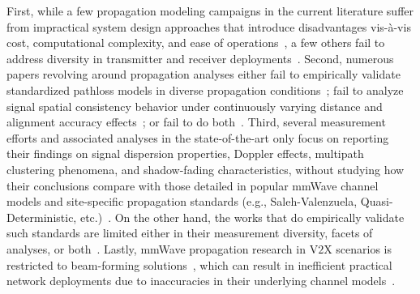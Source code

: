 \documentclass[12pt, draftcls, onecolumn]{IEEEtran}
\begin{document}
First, while a few propagation modeling campaigns in the current literature suffer from impractical system design approaches that introduce disadvantages vis-\`{a}-vis cost, computational complexity, and ease of operations~\cite{Purdue, Foliage, AgileLink}, a few others fail to address diversity in transmitter and receiver deployments~\cite{Harvard, Indoor60G, MacCartneyRural}. Second, numerous papers revolving around propagation analyses either fail to empirically validate standardized pathloss models in diverse propagation conditions~\cite{SpatialConsistencyOriginal, MolischSpatialOutdoor, MacCartneySpatialStatistics}; fail to analyze signal spatial consistency behavior under continuously varying distance and alignment accuracy effects~\cite{Outdoor28G, Qualcomm3GPP, MacCartneyModelsOverview}; or fail to do both~\cite{Indoor60G, SuburbanGeometryJournal, FoliageSimulations}. Third, several measurement efforts and associated analyses in the state-of-the-art only focus on reporting their findings on signal dispersion properties, Doppler effects, multipath clustering phenomena, and shadow-fading characteristics, without studying how their conclusions compare with those detailed in popular mmWave channel models and site-specific propagation standards (e.g., Saleh-Valenzuela, Quasi-Deterministic, etc.)~\cite{PDAPs, DopplerHST, Outdoor28G, SpatialDynamics, V2XBlockages}. On the other hand, the works that do empirically validate such standards are limited either in their measurement diversity, facets of analyses, or both~\cite{Indoor60G, NISTModeling, QDC_NIST, D2DHumanBlockage}. Lastly, mmWave propagation research in V$2$X scenarios is restricted to beam-forming solutions~\cite{VehicularBeamSelection, CVBeamAlignmentV2X}, which can result in inefficient practical network deployments due to inaccuracies in their underlying channel models~\cite{MolischEstimate, IoV}.
\end{document}
